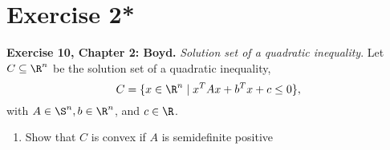 

\section*{Exercise 2*}

\textbf{Exercise 10, Chapter 2: Boyd.} \textit{Solution set of a quadratic inequality}. Let $C\subseteq \R^n$ be the solution set of a quadratic inequality,
\[ C = \{ x \in \R^{n} \;|\; x^T A x + b^T x + c \leq 0 \}, \]
with $A \in \S^{n}, b \in \R^n $, and $c \in \R$.
\begin{enumerate}[label = (\alph*)]
    \item Show that $C$ is convex if $A $ is semidefinite positive
\end{enumerate}